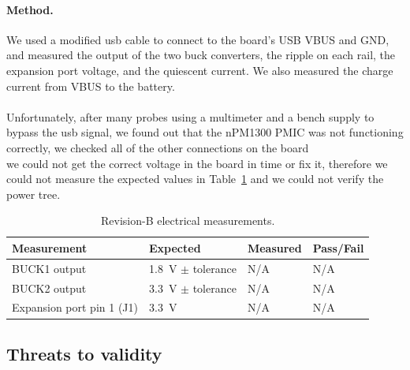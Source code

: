 \documentclass[12pt, a4paper]{article}
\begin{document}
\paragraph{Method.} We used a modified usb cable to connect to the board's USB VBUS and GND, and measured the output of the two buck converters, the ripple on each rail, the expansion port voltage, and the quiescent current. We also measured the charge current from VBUS to the battery.\\\\
Unfortunately, after many probes using a multimeter and a bench supply to bypass the usb signal, we found out that the nPM1300 PMIC was not functioning correctly, we checked all of the other connections on the board\\
we could not get the correct voltage in the board in time or fix it, therefore we could not measure the expected values in Table~\ref{tab:elec} and we could not verify the power tree. \\

\begin{table}[H]
\centering
\small
\begin{tabular}{@{}l l l l@{}}
\toprule
\textbf{Measurement} & \textbf{Expected} & \textbf{Measured} & \textbf{Pass/Fail} \\
\midrule
BUCK1 output & \SI{1.8}{\volt} $\pm$ tolerance & N/A & N/A \\
BUCK2 output & \SI{3.3}{\volt} $\pm$ tolerance & N/A & N/A \\
Expansion port pin 1 (J1) & \SI{3.3}{\volt} & N/A & N/A \\
\bottomrule
\end{tabular}
\caption{Revision-B electrical measurements.}
\label{tab:elec}
\end{table}

\subsection{Threats to validity}
\end{document}
